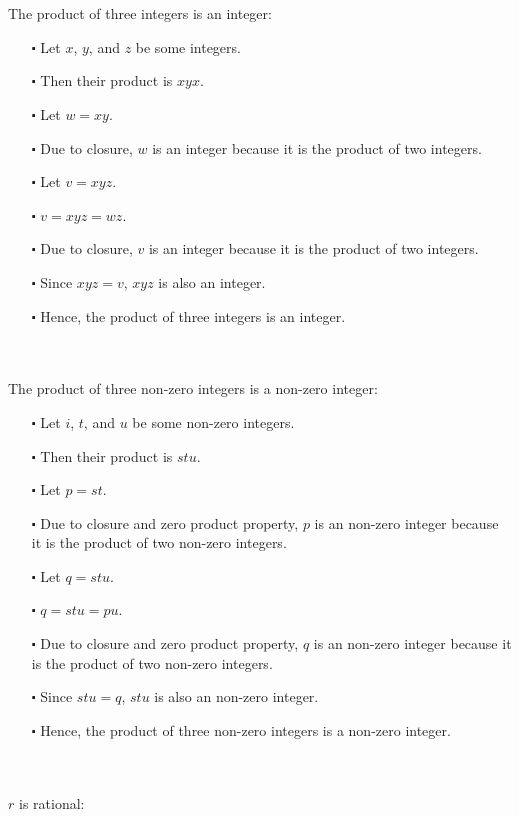 \documentclass[12pt]{article}
\begin{document}
\newblock
\\ \\
The product of three integers is an integer:
\begin{itemize}
  \item [$\centerdot$] Let $x$, $y$, and $z$ be some integers.
  \item [$\centerdot$] Then their product is $xyx$.
  \item [$\centerdot$] Let $w = xy$.
  \item [$\centerdot$] Due to closure, $w$ is an integer because it is the product of two integers.
  \item [$\centerdot$] Let $v = xyz$.
  \item [$\centerdot$] $v = xyz = wz$.
  \item [$\centerdot$] Due to closure, $v$ is an integer because it is the product of two integers.
  \item [$\centerdot$] Since $xyz = v$, $xyz$ is also an integer.
  \item [$\centerdot$] Hence, the product of three integers is an integer.
\end{itemize}
\newblock
\\ \\
The product of three non-zero integers is a non-zero integer:
\begin{itemize}
  \item [$\centerdot$] Let $i$, $t$, and $u$ be some non-zero integers.
  \item [$\centerdot$] Then their product is $stu$.
  \item [$\centerdot$] Let $p = st$.
  \item [$\centerdot$] Due to closure and zero product property, $p$ is an non-zero integer because it is the product of two non-zero integers.
  \item [$\centerdot$] Let $q = stu$.
  \item [$\centerdot$] $q = stu = pu$.
  \item [$\centerdot$] Due to closure and zero product property, $q$ is an non-zero integer because it is the product of two non-zero integers.
  \item [$\centerdot$] Since $stu = q$, $stu$ is also an non-zero integer.
  \item [$\centerdot$] Hence, the product of three non-zero integers is a non-zero integer.
\end{itemize}
\newblock
\\ \\
$r$ is rational:
\end{document}
